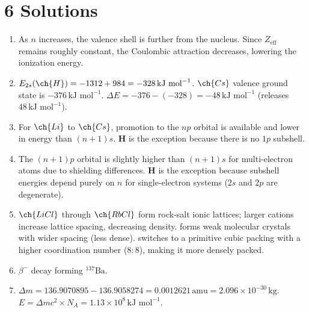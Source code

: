 \documentclass[11pt]{article}
\begin{document}
\section{6 Solutions}
\begin{enumerate}[label=\alph*.]
    \item As $n$ increases, the valence shell is further from the nucleus. Since $Z_{\text{eff}}$ remains roughly constant, the Coulombic attraction decreases, lowering the ionization energy.
    \item $E_{2s}(\ch{H}) = -1312 + 984 = -328\,\text{kJ mol}^{-1}$. $\ch{Cs}$ valence ground state is $-376\,\text{kJ mol}^{-1}$. $\Delta E = -376 - (-328) = -48\,\text{kJ mol}^{-1}$ (releases $48\,\text{kJ mol}^{-1}$).
    \item For $\ch{Li}$ to $\ch{Cs}$, promotion to the $np$ orbital is available and lower in energy than $(n+1)s$. \textbf{H} is the exception because there is no $1p$ subshell.
    \item The $(n+1)p$ orbital is slightly higher than $(n+1)s$ for multi-electron atoms due to shielding differences. \textbf{H} is the exception because subshell energies depend purely on $n$ for single-electron systems ($2s$ and $2p$ are degenerate).
    \item $\ch{LiCl}$ through $\ch{RbCl}$ form rock-salt ionic lattices; larger cations increase lattice spacing, decreasing density. \textbf{} forms weak molecular crystals with wider spacing (less dense). \textbf{} switches to a primitive cubic packing with a higher coordination number ($8:8$), making it more densely packed.
    \item $\beta^-$ decay forming $^{137}\text{Ba}$.
    \item $\Delta m = 136.9070895 - 136.9058274 = 0.0012621\,\text{amu} = 2.096\times10^{-30}\,\text{kg}$. $E = \Delta m c^2 \times N_A = 1.13\times10^8\,\text{kJ mol}^{-1}$.
\end{enumerate}
\end{document}
